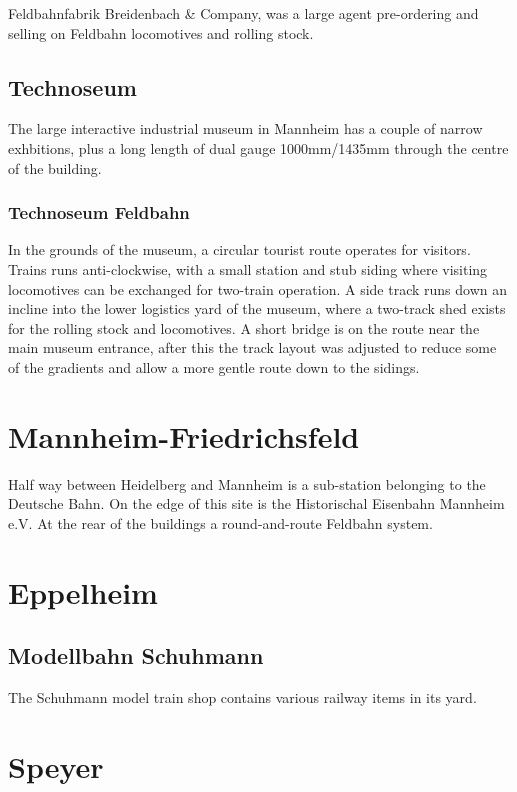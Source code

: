 \documentclass[a4paper]{report}
\begin{document}
Feldbahnfabrik Breidenbach \& Company, was a large agent pre-ordering
and selling on Feldbahn locomotives and rolling stock.

\subsection{Technoseum}

The large interactive industrial museum in Mannheim has a couple of
narrow exhbitions, plus a long length of dual gauge 1000mm/1435mm through the centre of the building.

\subsubsection{Technoseum Feldbahn}

In the grounds of the museum, a circular tourist route operates for
visitors.  Trains runs anti-clockwise, with a small station and stub
siding where visiting locomotives can be exchanged for two-train
operation.  A side track runs down an incline into the lower logistics
yard of the museum, where a two-track shed exists for the rolling
stock and locomotives.  A short bridge is on the route near the main
museum entrance, after this the track layout was adjusted to reduce
some of the gradients and allow a more gentle route down to the
sidings.

\section{Mannheim-Friedrichsfeld}

Half way between Heidelberg and Mannheim is a sub-station belonging to
the Deutsche Bahn.  On the edge of this site is the Historischal
Eisenbahn Mannheim e.V.  At the rear of the buildings a
round-and-route Feldbahn system.

\section{Eppelheim}

\subsection{Modellbahn Schuhmann}

The Schuhmann model train shop contains various railway items in its yard.

\section{Speyer}
\end{document}

